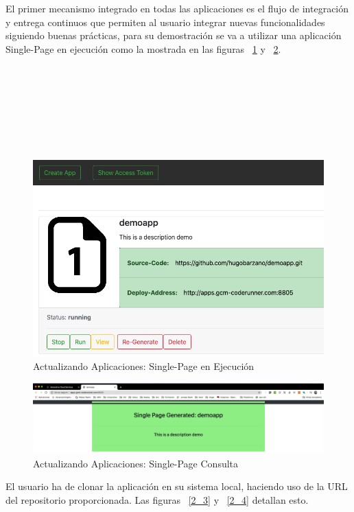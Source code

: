 \documentclass[a4paper,11pt]{book}
\begin{document}
El primer mecanismo integrado en todas las aplicaciones es el flujo de integración y entrega continuos que permiten al usuario integrar nuevas funcionalidades siguiendo buenas prácticas, para su demostración se va a utilizar una aplicación Single-Page en ejecución como la mostrada en las figuras  ~\ref{2_1}  y  ~\ref{2_2}.
~\\
~\\
~\\
~\\
~\\
~\\
~\\
~\\
\begin{figure}[H]
\centering
\includegraphics[scale=0.45]{imagenes/casouso_a/2_1.png}
\caption{ Actualizando Aplicaciones: Single-Page en Ejecución}
\label{2_1}
\end{figure}

\begin{figure}[H]
\centering
\includegraphics[scale=0.2]{imagenes/casouso_a/2_2.png}
\caption{  Actualizando Aplicaciones: Single-Page Consulta }
\label{2_2}
\end{figure}

 El usuario ha de clonar la aplicación en su sistema local, haciendo uso de la URL del repositorio proporcionada. Las figuras ~\ref{2_3} y ~\ref{2_4} detallan esto. 
 
\end{document}

